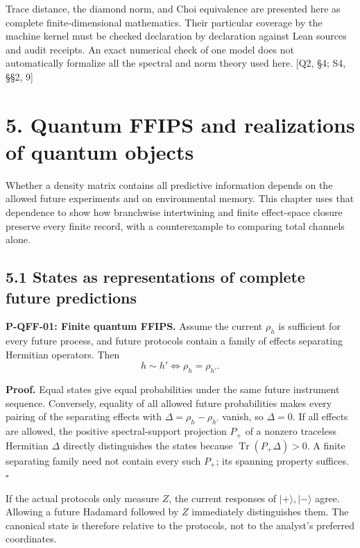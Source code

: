 \documentclass[
  11pt,
  oneside]{book}
\begin{document}
Trace distance, the diamond norm, and Choi equivalence are presented
here as complete finite-dimensional mathematics. Their particular
coverage by the machine kernel must be checked declaration by
declaration against Lean sources and audit receipts. An exact numerical
check of one model does not automatically formalize all the spectral and
norm theory used here. {[}Q2, §4; S4, §§2, 9{]}

\chapter{5. Quantum FFIPS and realizations of quantum
objects}\label{ch-5}

Whether a density matrix contains all predictive information depends on
the allowed future experiments and on environmental memory. This chapter
uses that dependence to show how branchwise intertwining and finite
effect-space closure preserve every finite record, with a counterexample
to comparing total channels alone.

\section{5.1 States as representations of complete future predictions}

\label{p-qff-01}{}

\textbf{P-QFF-01: Finite quantum FFIPS.} Assume the current \(\rho_h\)
is sufficient for every future process, and future protocols contain a
family of effects separating Hermitian operators. Then \[
h\sim h'\iff\rho_h=\rho_{h'}.
\]

\textbf{Proof.} Equal states give equal probabilities under the same
future instrument sequence. Conversely, equality of all allowed future
probabilities makes every pairing of the separating effects with
\(\Delta=\rho_h-\rho_{h'}\) vanish, so \(\Delta=0\). If all effects are
allowed, the positive spectral-support projection \(P_+\) of a nonzero
traceless Hermitian \(\Delta\) directly distinguishes the states because
\(\operatorname{Tr}(P_+\Delta)>0\). A finite separating family need not
contain every such \(P_+\); its spanning property suffices. \(\square\)

If the actual protocols only measure \(Z\), the current responses of
\(|+\rangle,|-\rangle\) agree. Allowing a future Hadamard followed by
\(Z\) immediately distinguishes them. The canonical state is therefore
relative to the protocols, not to the analyst's preferred coordinates.
\end{document}
